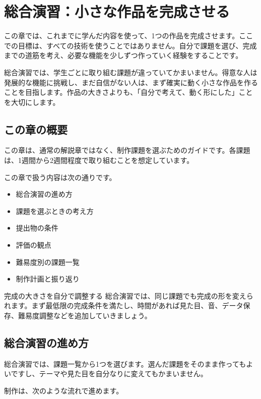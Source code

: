 \chapter{総合演習：小さな作品を完成させる}
\label{chap:final-projects}

この章では、これまでに学んだ内容を使って、1つの作品を完成させます。ここでの目標は、すべての技術を使うことではありません。自分で課題を選び、完成までの道筋を考え、必要な機能を少しずつ作っていく経験をすることです。

総合演習では、学生ごとに取り組む課題が違っていてかまいません。得意な人は発展的な機能に挑戦し、まだ自信がない人は、まず確実に動く小さな作品を作ることを目指します。作品の大きさよりも、「自分で考えて、動く形にした」ことを大切にします。

\section{この章の概要}

この章は、通常の解説章ではなく、制作課題を選ぶためのガイドです。各課題は、1週間から2週間程度で取り組むことを想定しています。

この章で扱う内容は次の通りです。

\begin{itemize}
    \item 総合演習の進め方
    \item 課題を選ぶときの考え方
    \item 提出物の条件
    \item 評価の観点
    \item 難易度別の課題一覧
    \item 制作計画と振り返り
\end{itemize}

\begin{pointbox}{完成の大きさを自分で調整する}
総合演習では、同じ課題でも完成の形を変えられます。まず最低限の完成条件を満たし、時間があれば見た目、音、データ保存、難易度調整などを追加していきましょう。
\end{pointbox}

\section{総合演習の進め方}

総合演習では、課題一覧から1つを選びます。選んだ課題をそのまま作ってもよいですし、テーマや見た目を自分なりに変えてもかまいません。

制作は、次のような流れで進めます。

